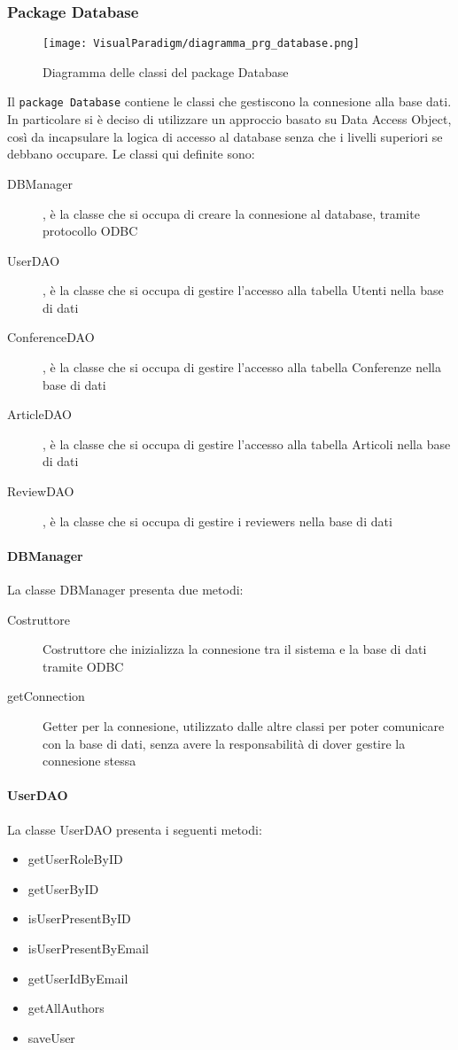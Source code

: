 \subsubsection{Package Database}
\begin{figure}[H]
  \centering
  \texttt{[image: VisualParadigm/diagramma\_prg\_database.png]}
  \caption{Diagramma delle classi del package Database}
  \label{fig:package_database}
\end{figure}

Il \texttt{package Database} contiene le classi che gestiscono la connesione
alla base dati. In particolare si è deciso di utilizzare un approccio basato
su Data Access Object, così da incapsulare la logica di accesso al database
senza che i livelli superiori se debbano occupare.
Le classi qui definite sono:
\begin{description}
\item[DBManager], è la classe che si occupa di creare la connesione al database, tramite protocollo ODBC
\item[UserDAO], è la classe che si occupa di gestire l'accesso alla tabella Utenti nella base di dati
\item[ConferenceDAO], è la classe che si occupa di gestire l'accesso alla tabella Conferenze nella base di dati
\item[ArticleDAO], è la classe che si occupa di gestire l'accesso alla tabella Articoli nella base di dati
\item[ReviewDAO], è la classe che si occupa di gestire i reviewers nella base di dati
\end{description}

\paragraph{DBManager}
La classe DBManager presenta due metodi:
\begin{description}
\item[Costruttore] Costruttore che inizializza la connesione tra il sistema e la base di dati tramite ODBC
\item[getConnection] Getter per la connesione, utilizzato dalle altre classi
  per poter comunicare con la base di dati, senza avere la responsabilità di
  dover gestire la connesione stessa
\end{description}

\paragraph{UserDAO}
La classe UserDAO presenta i seguenti metodi:
\begin{itemize}
\item getUserRoleByID
\item getUserByID
\item isUserPresentByID
\item isUserPresentByEmail
\item getUserIdByEmail
\item getAllAuthors
\item saveUser
\end{itemize}


